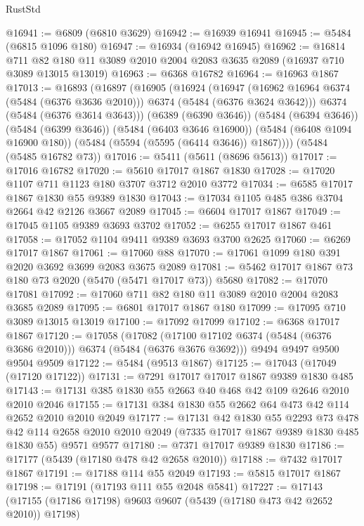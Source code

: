 \begin{lexlean}{RustStd}
\begin{coremodule}
@16941 := @6809 (@6810 @3629)
@16942 := @16939 @16941
@16945 := @5484 (@6815 @1096 @180)
@16947 := @16934 (@16942 @16945)
@16962 := @16814
    @711
    @82
    @180
    @11
    @3089
    @2010
    @2004
    @2083
    @3635
    @2089
    (@16937 @710 @3089 @13015 @13019)
@16963 := @6368 @16782
@16964 := @16963 @1867
@17013 := @16893
    (@16897
      (@16905
        (@16924
          (@16947
            (@16962 @16964 @6374 (@5484 (@6376 @3636 @2010)))
            @6374
            (@5484 (@6376 @3624 @3642)))
          @6374
          (@5484 (@6376 @3614 @3643)))
        (@6389 (@6390 @3646))
        (@5484 (@6394 @3646))
        (@5484 (@6399 @3646))
        (@5484 (@6403 @3646 @16900))
        (@5484 (@6408 @1094 @16900 @180))
        (@5484 (@5594 (@5595 (@6414 @3646)) @1867))))
    (@5484 (@5485 @16782 @73))
@17016 := @5411 (@5611 (@8696 @5613))
@17017 := @17016 @16782
@17020 := @5610 @17017 @1867 @1830
@17028 := @17020 @1107 @711 @1123 @180 @3707 @3712 @2010 @3772
@17034 := @6585 @17017 @1867 @1830 @55 @9389 @1830
@17043 := @17034 @1105 @485 @386 @3704 @2664 @42 @2126 @3667 @2089
@17045 := @6604 @17017 @1867
@17049 := @17045 @1105 @9389 @3693 @3702
@17052 := @6255 @17017 @1867 @461
@17058 := @17052 @1104 @9411 @9389 @3693 @3700 @2625
@17060 := @6269 @17017 @1867
@17061 := @17060 @88
@17070 := @17061 @1099 @180 @391 @2020 @3692 @3699 @2083 @3675 @2089
@17081 := @5462 @17017 @1867 @73 @180 @73 @2020 (@5470 (@5471 @17017 @73)) @5680
@17082 := @17070 @17081
@17092 := @17060 @711 @82 @180 @11 @3089 @2010 @2004 @2083 @3685 @2089
@17095 := @6801 @17017 @1867 @180
@17099 := @17095 @710 @3089 @13015 @13019
@17100 := @17092 @17099
@17102 := @6368 @17017 @1867
@17120 := @17058
    (@17082 (@17100 @17102 @6374 (@5484 (@6376 @3686 @2010))) @6374 (@5484 (@6376 @3676 @3692)))
    @9494
    @9497
    @9500
    @9504
    @9509
@17122 := @5484 (@9513 @1867)
@17125 := @17043 (@17049 (@17120 @17122))
@17131 := @7291 @17017 @17017 @1867 @9389 @1830 @485
@17143 := @17131 @385 @1830 @55 @2663 @40 @468 @42 @109 @2646 @2010 @2010 @2046
@17155 := @17131 @384 @1830 @55 @2662 @64 @473 @42 @114 @2652 @2010 @2010 @2049
@17177 := @17131
    @42
    @1830
    @55
    @2293
    @73
    @478
    @42
    @114
    @2658
    @2010
    @2010
    @2049
    (@7335 @17017 @1867 @9389 @1830 @485 @1830 @55)
    @9571
    @9577
@17180 := @7371 @17017 @9389 @1830
@17186 := @17177 (@5439 (@17180 @478 @42 @2658 @2010))
@17188 := @7432 @17017 @1867
@17191 := @17188 @114 @55 @2049
@17193 := @5815 @17017 @1867
@17198 := @17191 (@17193 @111 @55 @2048 @5841)
@17227 := @17143
    (@17155 (@17186 @17198) @9603 @9607 (@5439 (@17180 @473 @42 @2652 @2010)) @17198)

\end{coremodule}
\end{lexlean}
